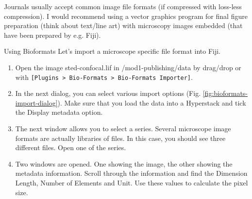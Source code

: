 Journals usually accept common image file formats (if compressed with loss-less compression). I would recommend using a vector graphics program for final figure preparation (think about text/line art) with microscopy images embedded (that have been prepared by e.g. Fiji).

\begin{taskbox}{Using Bioformats}
Let's import a microscope specific file format into Fiji.

\begin{enumerate}
	\item Open the image sted-confocal.lif in /mod1-publishing/data by drag/drop or with \texttt{[Plugins > Bio-Formats > Bio-Formats Importer]}.  
	\item In the next dialog, you can select various import options (Fig. \ref{fig:bioformats-import-dialog}). Make sure that you load the data into a Hyperstack and tick the Display metadata option.
	
	\begin{minipage}[t]{\linewidth}
		\begin{center}
		\medskip
		\label{fig:bioformats-import-dialog}
		\end{center}
	\end{minipage}
	
	\item The next window allows you to select a series. Several microscope image formats are actually libraries of files. In this case, you should see three different files. Open one of the series.
	\item Two windows are opened. One showing the image, the other showing the metadata information. Scroll through the information and find the Dimension Length, Number of Elements and Unit. Use these values to calculate the pixel size.
\end{enumerate}

\end{taskbox}

